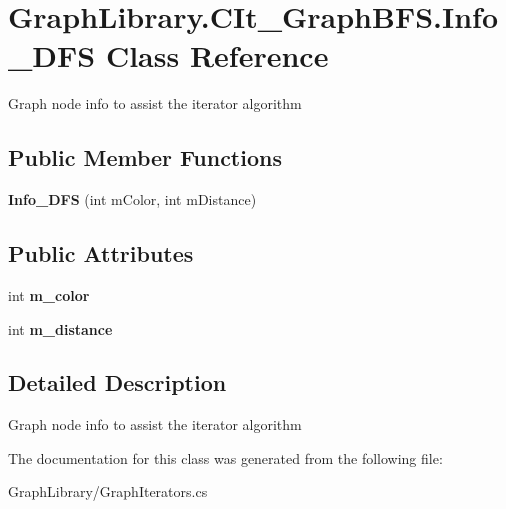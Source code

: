 \hypertarget{class_graph_library_1_1_c_it___graph_b_f_s_1_1_info___d_f_s}{}\section{Graph\+Library.\+C\+It\+\_\+\+Graph\+B\+F\+S.\+Info\+\_\+\+D\+F\+S Class Reference}
\label{class_graph_library_1_1_c_it___graph_b_f_s_1_1_info___d_f_s}


Graph node info to assist the iterator algorithm  


\subsection*{Public Member Functions}
\begin{DoxyCompactItemize}
\item 
\hypertarget{class_graph_library_1_1_c_it___graph_b_f_s_1_1_info___d_f_s_a5ea2f57738f60298d90c9f2c74e5d862}{}{\bfseries Info\+\_\+\+D\+F\+S} (int m\+Color, int m\+Distance)\label{class_graph_library_1_1_c_it___graph_b_f_s_1_1_info___d_f_s_a5ea2f57738f60298d90c9f2c74e5d862}

\end{DoxyCompactItemize}
\subsection*{Public Attributes}
\begin{DoxyCompactItemize}
\item 
\hypertarget{class_graph_library_1_1_c_it___graph_b_f_s_1_1_info___d_f_s_a305bf8d7f018e0ab9f75d5873f42d098}{}int {\bfseries m\+\_\+color}\label{class_graph_library_1_1_c_it___graph_b_f_s_1_1_info___d_f_s_a305bf8d7f018e0ab9f75d5873f42d098}

\item 
\hypertarget{class_graph_library_1_1_c_it___graph_b_f_s_1_1_info___d_f_s_a331eb1a07629309df29d453109d55d03}{}int {\bfseries m\+\_\+distance}\label{class_graph_library_1_1_c_it___graph_b_f_s_1_1_info___d_f_s_a331eb1a07629309df29d453109d55d03}

\end{DoxyCompactItemize}


\subsection{Detailed Description}
Graph node info to assist the iterator algorithm 



The documentation for this class was generated from the following file\+:\begin{DoxyCompactItemize}
\item 
Graph\+Library/Graph\+Iterators.\+cs\end{DoxyCompactItemize}
